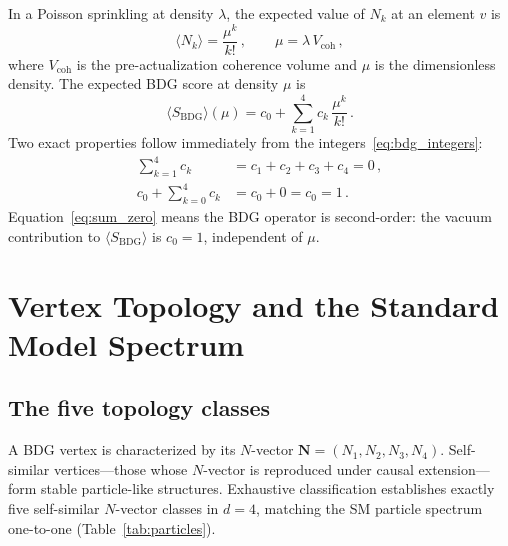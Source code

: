 \documentclass[11pt,twocolumn]{article}
\newcommand{\bdg}{\mathrm{BDG}}
\begin{document}
In a Poisson sprinkling at density $\lambda$, the expected value of
$N_k$ at an element $v$ is
\begin{equation}
  \langle N_k\rangle = \frac{\mu^k}{k!}\,,
  \qquad \mu = \lambda\,V_{\mathrm{coh}}\,,
  \label{eq:Nk_mean}
\end{equation}
where $V_{\mathrm{coh}}$ is the pre-actualization coherence volume and
$\mu$ is the dimensionless density.
The expected BDG score at density $\mu$ is
\begin{equation}
  \langle S_\bdg\rangle(\mu)
  = c_0 + \sum_{k=1}^{4} c_k\,\frac{\mu^k}{k!}\,.
  \label{eq:S_mean}
\end{equation}
Two exact properties follow immediately from the
integers~\eqref{eq:bdg_integers}:
\begin{align}
  \sum_{k=1}^{4} c_k &= c_1+c_2+c_3+c_4 = 0\,,
  \label{eq:sum_zero}\\
  c_0 + \sum_{k=0}^{4} c_k &= c_0 + 0 = c_0 = 1\,.
  \label{eq:c0}
\end{align}
Equation~\eqref{eq:sum_zero} means the BDG operator is second-order:
the vacuum contribution to $\langle S_\bdg\rangle$ is $c_0 = 1$,
independent of $\mu$.

\section{Vertex Topology and the Standard Model Spectrum}

\subsection{The five topology classes}

A BDG vertex is characterized by its $N$-vector
$\mathbf{N} = (N_1, N_2, N_3, N_4)$.
Self-similar vertices---those whose $N$-vector is reproduced under
causal extension---form stable particle-like structures. Exhaustive
classification establishes exactly five
self-similar $N$-vector classes in $d=4$, matching the SM particle
spectrum one-to-one (Table~\ref{tab:particles}).
\end{document}
